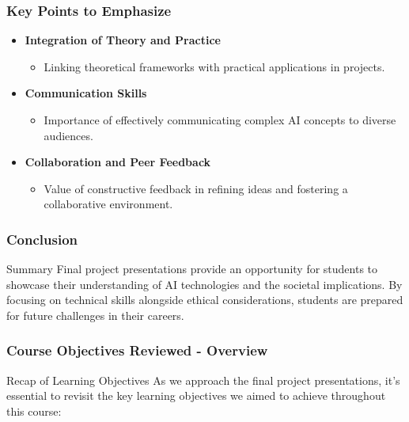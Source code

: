 \documentclass[aspectratio=169]{beamer}
\begin{document}
\begin{frame}[fragile]
    \frametitle{Key Points to Emphasize}
    \begin{itemize}
        \item \textbf{Integration of Theory and Practice}
        \begin{itemize}
            \item Linking theoretical frameworks with practical applications in projects.
        \end{itemize}
        
        \item \textbf{Communication Skills}
        \begin{itemize}
            \item Importance of effectively communicating complex AI concepts to diverse audiences.
        \end{itemize}
        
        \item \textbf{Collaboration and Peer Feedback}
        \begin{itemize}
            \item Value of constructive feedback in refining ideas and fostering a collaborative environment.
        \end{itemize}
    \end{itemize}
\end{frame}

\begin{frame}[fragile]
    \frametitle{Conclusion}
    \begin{block}{Summary}
        Final project presentations provide an opportunity for students to showcase their understanding of AI technologies and the societal implications. By focusing on technical skills alongside ethical considerations, students are prepared for future challenges in their careers.
    \end{block}
\end{frame}

\begin{frame}[fragile]
    \frametitle{Course Objectives Reviewed - Overview}
    \begin{block}{Recap of Learning Objectives}
        As we approach the final project presentations, it's essential to revisit the key learning objectives we aimed to achieve throughout this course:
    \end{block}
\end{frame}
\end{document}
